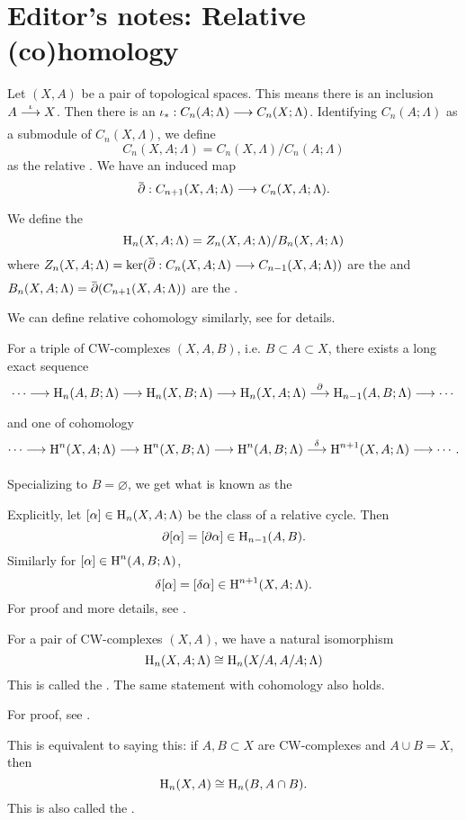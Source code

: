 \documentclass[../main]{subfiles}
\begin{document}
\section{Editor's notes: Relative (co)homology}

\begin{definition}
Let $(X,A)$ be a pair of topological spaces. This means there is an inclusion $A\varrightarrow{\iota} X$. Then there is an  $\iota_\ast:C_n(A;\Lambda) \varrightarrow{} C_n(X;\Lambda)$. Identifying $C_n(A;\Lambda)$ as a submodule of $C_n(X,\Lambda)$, we define 
\[C_n(X,A;\Lambda) = C_n(X,\Lambda)/C_n(A;\Lambda) \]
as the relative . We have an induced map
\[\xoverline{\partial}:C_{n+1}(X,A;\Lambda)\varrightarrow{}C_n(X,A;\Lambda). \]
We define the 
\[\operatorname{H}_n(X, A;\Lambda)=Z_n(X,A;\Lambda)/B_n(X,A;\Lambda)\]
where $Z_n(X,A;\Lambda)=\ker(\xoverline{\partial}:C_{n}(X,A;\Lambda)\varrightarrow{}C_{n-1}(X,A;\Lambda))$ are the  and $B_n(X,A;\Lambda)=\xoverline{\partial}(C_{n+1}(X,A;\Lambda))$ are the .
\end{definition}

We can define relative cohomology similarly, see \cite[p. 199]{hatcher2002algebraic} for details. 

\begin{theorem*} For a triple of CW-complexes $(X,A,B)$, i.e. $B\subset A\subset X$, there exists a long exact sequence
\[\cdots \varrightarrow{}\homology_n(A,B;\Lambda)\varrightarrow{}\homology_n(X,B;\Lambda)\varrightarrow{}\homology_n(X,A;\Lambda)\varrightarrow{\partial}\homology_{n-1}(A,B;\Lambda)\varrightarrow{}\cdots\]
and one of cohomology 
\[\cdots \varrightarrow{}\homology^n(X,A;\Lambda)\varrightarrow{}\homology^n(X,B;\Lambda)\varrightarrow{}\homology^n(A,B;\Lambda)\varrightarrow{\delta} \homology^{n+1}(X,A;\Lambda)\varrightarrow{}\cdots.\]
\end{theorem*}
Specializing to $B=\varnothing$, we get what is known as the  

Explicitly, let $[\alpha]\in \operatorname{H}_n(X,A;\Lambda)$ be the class of a relative cycle. Then \[\partial [\alpha] = [\partial \alpha]\in \operatorname{H}_{n-1}(A,B).\] Similarly for $[\alpha] \in \operatorname{H}^n(A,B;\Lambda)$, \[\delta[\alpha] = [\delta\alpha] \in \operatorname{H}^{n+1}(X,A;\Lambda).\]
For proof and more details, see \cite[p. 113,199]{hatcher2002algebraic}.

\begin{theorem*}[Excision]
For a pair of CW-complexes $(X,A)$, we have a natural isomorphism
\[
\operatorname{H}_n(X,A;\Lambda)\cong \operatorname{H}_n(X/A, A/A;\Lambda)
\]
This is called the . The same statement with cohomology also holds.
\end{theorem*}
For proof, see \cite[p. 119]{hatcher2002algebraic}.

This is equivalent to saying this: if $A,B\subset X$ are CW-complexes and \newline $A\cup B=X$, then
\[\operatorname{H}_n(X,A) \cong \operatorname{H}_n(B,A\cap B).\]
This is also called the .
\end{document}
